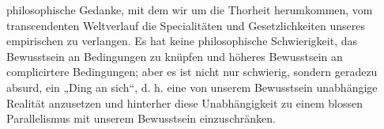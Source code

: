 philosophische Gedanke, mit dem wir um die Thorheit herumkommen, vom transcendenten Weltverlauf die Specialitäten und Gesetzlichkeiten unseres empirischen zu verlangen. Es hat keine philosophische Schwierigkeit, das Bewusstsein an Bedingungen zu knüpfen und höheres Bewusstsein an complicirtere Bedingungen; aber es ist nicht nur schwierig, sondern geradezu absurd, ein „Ding an sich“, d. h. eine von unserem Bewusstsein unabhängige Realität anzusetzen und hinterher diese Unabhängigkeit zu einem blossen Parallelismus mit unserem Bewusstsein einzuschränken.
\par

